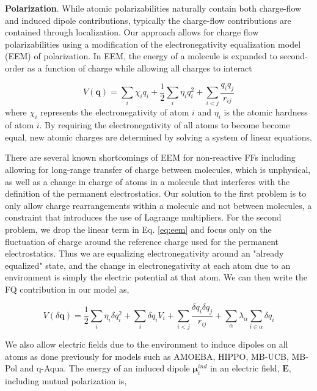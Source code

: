 \documentclass[journal=jctcce,manuscript=article]{achemso}
\begin{document}
\textbf{Polarization}. While atomic polarizabilities naturally contain both charge-flow and induced dipole
contributions\cite{stone1985distributedb}, typically the charge-flow contributions
are contained through localization.\cite{ruth1994localization} Our approach allows for charge flow polarizabilities using a modification of the electronegativity
equalization model (EEM) of polarization.\cite{mortier1986electronegativity} In EEM,
the energy of a molecule is expanded to second-order as a function of charge while allowing
all charges to interact

\begin{equation}
  V(\bm{q})=\sum_i \chi_i q_i + \frac12 \sum_i \eta_i q_i^2 + \sum_{i<j} \frac{q_i q_j}{r_{ij}}
  \label{eq:eem}
\end{equation}
where $\chi_i$ represents the electronegativity of atom $i$ and
$\eta_i$ is the atomic hardness of atom $i$. By requiring the electronegativity of all atoms
to become become equal, new atomic charges are determined by solving a system of linear equations. 

There are several known shortcomings of EEM for non-reactive FFs including allowing for long-range transfer of charge between molecules, which is unphysical,\cite{chen2007qtpie,chen2008unified}
as well as a change in charge of atoms in a molecule that interferes with the definition of the permanent electrostatics. Our solution to the first problem is to only allow charge rearrangements within a molecule and not between molecules, a constraint that introduces the use of Lagrange multipliers. For the second problem, we drop the linear term in Eq. \ref{eq:eem} and focus only on the fluctuation of charge around the reference charge used for the permanent electrostatics. Thus we are equalizing electronegativity around an "already
equalized" state, and the change in electronegativity at each atom due to an environment is simply
the electric potential at that atom. We can then write the FQ contribution in our
model as,

\begin{equation}
  V(\delta \bm{q})=\frac12\sum_i \eta_i \delta q_i^2 + \sum_i \delta q_i V_i + \sum_{i<j}\frac{\delta q_i \delta q_j}{r_{ij}} + \sum_{\alpha}\lambda_\alpha \sum_{i\in\alpha}\delta q_{i}
  \label{eq:fq}
\end{equation}

We also allow electric fields due to the environment to induce dipoles on all atoms as done previously for models such as AMOEBA, HIPPO, MB-UCB, MB-Pol and q-Aqua. The energy of an induced dipole $\bm{\mu}_i^{ind}$ in an electric field, $\bm{E}$, including mutual polarization is,
\end{document}
